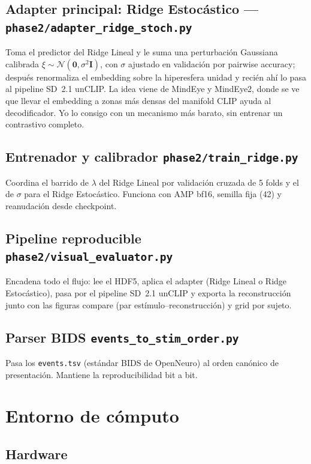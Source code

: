 \subsection{Adapter principal: Ridge Estocástico --- \texttt{phase2/adapter\_ridge\_stoch.py}}

Toma el predictor del Ridge Lineal y le suma una perturbación Gaussiana calibrada 
$\xi \sim \mathcal{N}(\mathbf{0},\sigma^{2}\mathbf{I})$, con $\sigma$ ajustado en validación 
por pairwise accuracy; después renormaliza el embedding sobre la hiperesfera unidad y recién 
ahí lo pasa al pipeline SD~2.1 unCLIP. La idea viene de MindEye y MindEye2, donde se ve que 
llevar el embedding a zonas más densas del manifold CLIP ayuda al decodificador. Yo lo consigo 
con un mecanismo más barato, sin entrenar un contrastivo completo.

\subsection{Entrenador y calibrador \texttt{phase2/train\_ridge.py}}

Coordina el barrido de $\lambda$ del Ridge Lineal por validación cruzada de 5 folds y el de 
$\sigma$ para el Ridge Estocástico. Funciona con AMP bf16, semilla fija (42) y reanudación 
desde checkpoint.

\subsection{Pipeline reproducible \texttt{phase2/visual\_evaluator.py}}

Encadena todo el flujo: lee el HDF5, aplica el adapter (Ridge Lineal o Ridge Estocástico), 
pasa por el pipeline SD~2.1 unCLIP y exporta la reconstrucción junto con las figuras compare 
(par estímulo--reconstrucción) y grid por sujeto.

\subsection{Parser BIDS \texttt{events\_to\_stim\_order.py}}

Pasa los \texttt{events.tsv} (estándar BIDS de OpenNeuro) al orden canónico de presentación. 
Mantiene la reproducibilidad bit a bit.

\section{Entorno de cómputo}

\subsection{Hardware}

